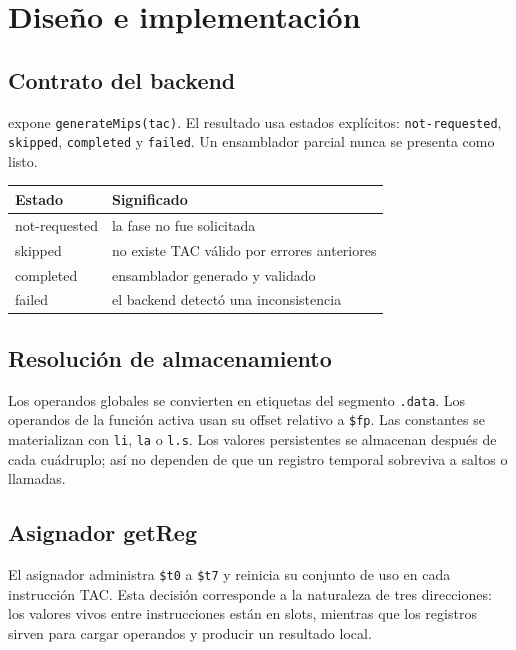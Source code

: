 \documentclass[11pt,letterpaper,oneside]{report}
\newcommand{\codigo}[1]{\texttt{#1}}
\newcommand{\archivo}[1]{\texttt{\detokenize{#1}}}
\begin{document}
\chapter{Dise\~no e implementaci\'on}

\section{Contrato del backend}

\archivo{src/mips/generator.ts} expone \codigo{generateMips(tac)}. El resultado usa estados expl\'icitos: \codigo{not-requested}, \codigo{skipped}, \codigo{completed} y \codigo{failed}. Un ensamblador parcial nunca se presenta como listo.

\begin{longtable}{p{3cm}p{10cm}}
\toprule
Estado & Significado\\\midrule
\endhead
not-requested & la fase no fue solicitada\\
skipped & no existe TAC v\'alido por errores anteriores\\
completed & ensamblador generado y validado\\
failed & el backend detect\'o una inconsistencia\\
\bottomrule
\end{longtable}

\section{Resoluci\'on de almacenamiento}

Los operandos globales se convierten en etiquetas del segmento \codigo{.data}. Los operandos de la funci\'on activa usan su offset relativo a \codigo{\$fp}. Las constantes se materializan con \codigo{li}, \codigo{la} o \codigo{l.s}. Los valores persistentes se almacenan despu\'es de cada cu\'adruplo; as\'i no dependen de que un registro temporal sobreviva a saltos o llamadas.

\section{Asignador getReg}

El asignador administra \codigo{\$t0} a \codigo{\$t7} y reinicia su conjunto de uso en cada instrucci\'on TAC. Esta decisi\'on corresponde a la naturaleza de tres direcciones: los valores vivos entre instrucciones est\'an en slots, mientras que los registros sirven para cargar operandos y producir un resultado local.
\end{document}
